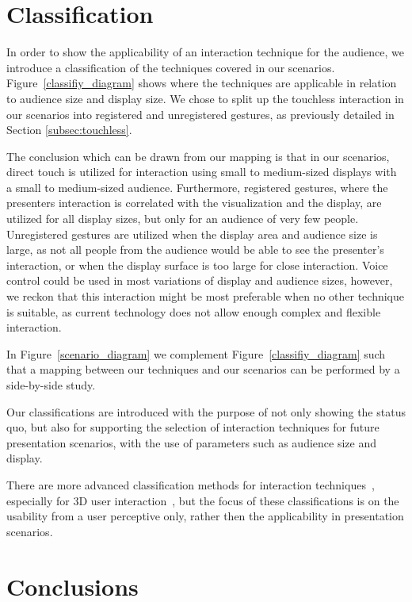 \documentclass[review,journal]{vgtc}         %
\begin{document}
\section{Classification} \label{sec:classification}

In order to show the applicability of an interaction technique for the audience, we introduce a classification of the techniques covered in our scenarios.
Figure~\ref{classifiy_diagram} shows where the techniques are applicable in relation to audience size and display size. 
We chose to split up the touchless interaction in our scenarios into registered and unregistered gestures, as previously detailed in Section \ref{subsec:touchless}.

The conclusion which can be drawn from our mapping is that in our scenarios, direct touch is utilized for interaction using small to medium-sized displays with a small to medium-sized audience. 
Furthermore, registered gestures, where the presenters interaction is correlated with the visualization and the display, are utilized for all display sizes, but only for an audience of very few people.
Unregistered gestures are utilized when the display area and audience size is large, as not all people from the audience would be able to see the presenter's interaction, or when the display surface is too large for close interaction.
Voice control could be used in most variations of display and audience sizes, however, we reckon that this interaction might be most preferable when no other technique is suitable, as current technology does not allow enough complex and flexible interaction.

In Figure~\ref{scenario_diagram} we complement Figure~\ref{classifiy_diagram} such that a mapping between our techniques and our scenarios can 
be performed by a side-by-side study.

Our classifications are introduced with the purpose of not only showing the status quo, but also for supporting the selection of interaction techniques for future presentation scenarios, with the use of parameters such as audience size and display.

There are more advanced classification methods for interaction techniques~\cite{stars:65-93:2012}, especially for 3D user interaction~\cite{978-3-319-07458-0_1, CGF:CGF194, Kettner95aclassification}, but the focus of these classifications is on the usability from a user perceptive only, rather then the applicability in presentation scenarios.

\section{Conclusions}\label{sec:conclusion}
\end{document}
